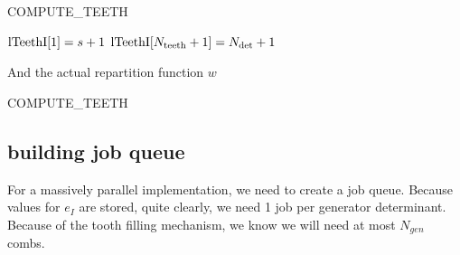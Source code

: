 \documentclass[./thesis.tex]{subfiles}
\begin{document}
\begin{algorithm}
	\caption{COMPUTE\_TEETH}
	$\text{lTeethI}[1] = s+1$ \;
	$\text{lTeethI}[N_\text{teeth}+1] = {N_\text{det}}+1$ \;
\end{algorithm}

And the actual repartition function $w$

\begin{algorithm}
	\caption{COMPUTE\_TEETH}
	
	
\end{algorithm}



\subsection{building job queue}

For a massively parallel implementation, we need to create a job queue. Because values for $e_I$ are stored, quite clearly, we need 1 job per generator determinant. Because of the tooth filling mechanism, we know we will need at most $N_{gen}$ combs.
\end{document}
